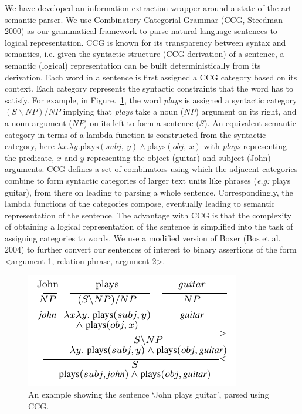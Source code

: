 \documentclass{llncs}
\begin{document}
We have developed an information extraction wrapper around a state-of-the-art semantic parser. We use Combinatory Categorial Grammar (CCG, Steedman 2000) as our grammatical framework to parse natural language sentences to logical representation. CCG is known for its transparency between syntax and semantics, i.e. given the syntactic structure (CCG derivation) of a sentence, a semantic (logical) representation can be built deterministically from its derivation. Each word in a sentence is first assigned a CCG category based on its context. Each category represents the syntactic constraints that the word has to satisfy. For example, in Figure.~\ref{fig:ccg_sample}, the word \textit{plays} is assigned a syntactic category $(S\backslash NP)/NP$ implying that \textit{plays} take a noun ($NP$) argument on its right, and a noun argument ($NP$) on its left to form a sentence ($S$). An equivalent semantic category in terms of a lambda function is constructed from the syntactic category, here $\lambda x. \lambda y. \mathrm{plays}(subj,~y) \wedge \mathrm{plays}(obj,~x)$ with \textit{plays} representing the predicate, $x$ and $y$ representing the object (guitar) and subject (John) arguments. CCG defines a set of combinators using which the adjacent categories combine to form syntactic categories of larger text units like phrases (\textit{e.g:} plays guitar), from there on leading to parsing a whole sentence. Correspondingly, the lambda functions of the categories compose, eventually leading to semantic representation of the sentence. The advantage with CCG is that the complexity of obtaining a logical representation of the sentence is simplified into the task of assigning categories to words. We use a modified version of Boxer (Bos et al. 2004) to further convert our sentences of interest to binary assertions of the form <argument 1, relation phrase, argument 2>.
\begin{figure}[!t]
\centering
\includegraphics[width=0.6\linewidth]{figures/ccg_sample.pdf}
\caption{An example showing the sentence `John plays guitar', parsed using CCG.}
\label{fig:ccg_sample}
\end{figure}
\end{document}
